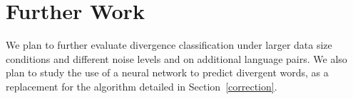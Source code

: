 \documentclass[11pt,a4paper]{article}
\begin{document}
\section{Further Work}
\label{further}

We plan to further evaluate divergence classification under larger data size conditions and different noise levels and on additional language pairs. 
We also plan to study the use of a neural network to predict divergent words, as a replacement for the algorithm detailed in Section~\ref{correction}.




\end{document}
